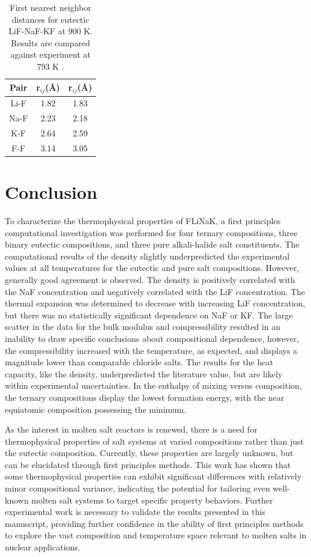 \documentclass[preprint,12pt]{elsarticle}
\begin{document}
\begin{table}[h!]
\centering
\caption{First nearest neighbor distances for eutectic LiF-NaF-KF at 900 K. Results are compared against experiment at 793 K \cite{igarashi1988}. }
\begin{tabular}{ccc}
\hline
Pair & r$_{ij}$(\AA)  & r$_{ij}$(\AA)\cite{igarashi1988}   \\
\hline
Li-F & 1.82 & 1.83 \\
Na-F & 2.23 & 2.18 \\
K-F & 2.64 & 2.59 \\
F-F & 3.14 & 3.05 \\
\hline
\end{tabular}
\label{table:cn}
\end{table} 

\FloatBarrier

\section{Conclusion}

To characterize the thermophysical properties of FLiNaK, a first principles computational investigation was performed for four ternary compositions, three binary eutectic compositions, and three pure alkali-halide salt constituents. The computational results of the density slightly underpredicted the experimental values at all temperatures for the eutectic and pure salt compositions. However, generally good agreement is observed. The density is positively correlated with the NaF concentration and negatively correlated with the LiF concentration. The thermal expansion was determined to decrease with increasing LiF concentration, but there was no statistically significant dependence on NaF or KF. The large scatter in the data for the bulk modulus and compressibility resulted in an inability to draw specific conclusions about compositional dependence, however, the compressibility increased with the temperature, as expected, and displays a magnitude lower than comparable chloride salts. The results for the heat capacity, like the density, underpredicted the literature value, but are likely within experimental uncertainties. In the enthalpy of mixing versus composition, the ternary compositions display the lowest formation energy, with the near equiatomic composition possessing the minimum. 


As the interest in molten salt reactors is renewed, there is a need for thermophysical properties of salt systems at varied compositions rather than just the eutectic composition. Currently, these properties are largely unknown, but can be elucidated through first principles methods. This work has shown that some thermophysical properties can exhibit significant differences with relatively minor compositional variance, indicating the potential for tailoring even well-known molten salt systems to target specific property behaviors. Further experimental work is necessary to validate the results presented in this manuscript, providing further confidence in the ability of first principles methods to explore the vast composition and temperature space relevant to molten salts in nuclear applications. 
\end{document}
